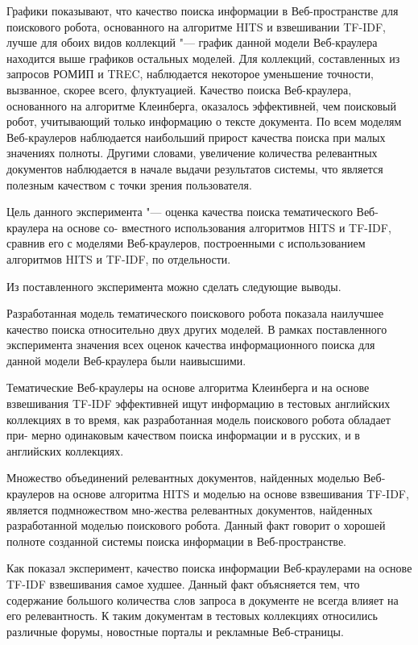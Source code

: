 Графики показывают, что качество поиска информации в Веб-пространстве для поискового робота, основанного на алгоритме HITS и взвешивании TF-IDF, лучше для обоих видов коллекций "--- график данной модели Веб-краулера находится выше графиков остальных моделей. Для коллекций, составленных из запросов РОМИП и TREC, наблюдается некоторое уменьшение точности, вызванное, скорее всего, флуктуацией. Качество поиска Веб-краулера, основанного на алгоритме Клеинберга, оказалось эффективней, чем поисковый робот, учитывающий только информацию о тексте документа. По всем моделям Веб-краулеров наблюдается наибольший прирост качества поиска при малых значениях полноты. Другими словами, увеличение количества релевантных документов наблюдается в начале выдачи результатов системы, что является полезным качеством с точки зрения пользователя.

Цель данного эксперимента "--- оценка качества поиска тематического Веб-краулера на основе со- вместного использования алгоритмов HITS и TF-IDF, сравнив его с моделями Веб-краулеров, построенными с использованием алгоритмов HITS и TF-IDF, по отдельности.

Из поставленного эксперимента можно сделать следующие выводы.

Разработанная модель тематического поискового робота показала наилучшее качество поиска относительно двух других моделей. В рамках поставленного эксперимента значения всех оценок качества информационного поиска для данной модели Веб-краулера были наивысшими.

Тематические Веб-краулеры на основе алгоритма Клеинберга и на основе взвешивания TF-IDF эффективней ищут информацию в тестовых английских коллекциях в то время, как разработанная модель поискового робота обладает при- мерно одинаковым качеством поиска информации и в русских, и в английских коллекциях.

Множество объединений релевантных документов, найденных моделью Веб-краулеров на основе алгоритма HITS и моделью на основе взвешивания TF-IDF, является подмножеством мно-жества релевантных документов, найденных разработанной моделью поискового робота. Данный факт говорит о хорошей полноте созданной системы поиска информации в Веб-пространстве.

Как показал эксперимент, качество поиска информации Веб-краулерами на основе TF-IDF взвешивания самое худшее. Данный факт объясняется тем, что содержание большого количества слов запроса в документе не всегда влияет на его релевантность. К таким документам в тестовых коллекциях относились различные форумы, новостные порталы и рекламные Веб-страницы.

